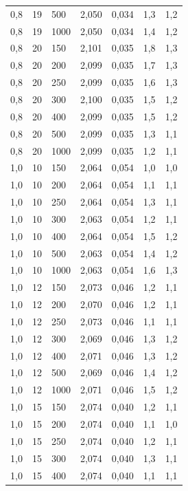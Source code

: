 \begin{tabular}{lllllll}
        0,8 & 19 & 500 & 2,050 & 0,034 & 1,3 & 1,2 \\ 
        0,8 & 19 & 1000 & 2,050 & 0,034 & 1,4 & 1,2 \\ 
        0,8 & 20 & 150 & 2,101 & 0,035 & 1,8 & 1,3 \\ 
        0,8 & 20 & 200 & 2,099 & 0,035 & 1,7 & 1,3 \\ 
        0,8 & 20 & 250 & 2,099 & 0,035 & 1,6 & 1,3 \\ 
        0,8 & 20 & 300 & 2,100 & 0,035 & 1,5 & 1,2 \\ 
        0,8 & 20 & 400 & 2,099 & 0,035 & 1,5 & 1,2 \\ 
        0,8 & 20 & 500 & 2,099 & 0,035 & 1,3 & 1,1 \\ 
        0,8 & 20 & 1000 & 2,099 & 0,035 & 1,2 & 1,1 \\ 
        1,0 & 10 & 150 & 2,064 & 0,054 & 1,0 & 1,0 \\ 
        1,0 & 10 & 200 & 2,064 & 0,054 & 1,1 & 1,1 \\ 
        1,0 & 10 & 250 & 2,064 & 0,054 & 1,3 & 1,1 \\ 
        1,0 & 10 & 300 & 2,063 & 0,054 & 1,2 & 1,1 \\ 
        1,0 & 10 & 400 & 2,064 & 0,054 & 1,5 & 1,2 \\ 
        1,0 & 10 & 500 & 2,063 & 0,054 & 1,4 & 1,2 \\ 
        1,0 & 10 & 1000 & 2,063 & 0,054 & 1,6 & 1,3 \\ 
        1,0 & 12 & 150 & 2,073 & 0,046 & 1,2 & 1,1 \\ 
        1,0 & 12 & 200 & 2,070 & 0,046 & 1,2 & 1,1 \\ 
        1,0 & 12 & 250 & 2,073 & 0,046 & 1,1 & 1,1 \\ 
        1,0 & 12 & 300 & 2,069 & 0,046 & 1,3 & 1,2 \\ 
        1,0 & 12 & 400 & 2,071 & 0,046 & 1,3 & 1,2 \\ 
        1,0 & 12 & 500 & 2,069 & 0,046 & 1,4 & 1,2 \\ 
        1,0 & 12 & 1000 & 2,071 & 0,046 & 1,5 & 1,2 \\ 
        1,0 & 15 & 150 & 2,074 & 0,040 & 1,2 & 1,1 \\ 
        1,0 & 15 & 200 & 2,074 & 0,040 & 1,1 & 1,0 \\ 
        1,0 & 15 & 250 & 2,074 & 0,040 & 1,2 & 1,1 \\ 
        1,0 & 15 & 300 & 2,074 & 0,040 & 1,3 & 1,1 \\ 
        1,0 & 15 & 400 & 2,074 & 0,040 & 1,1 & 1,1 \\ 

\end{tabular}
